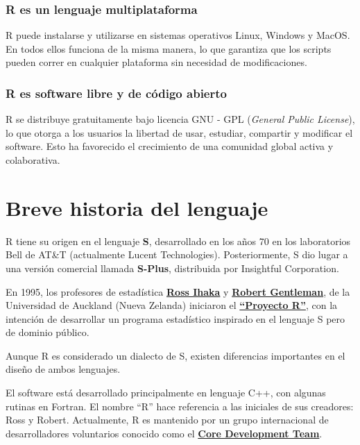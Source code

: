 \documentclass[
  spanish,
  a4paper,
]{scrbook}
\begin{document}
\subsubsection{R es un lenguaje
multiplataforma}\label{r-es-un-lenguaje-multiplataforma}

R puede instalarse y utilizarse en sistemas operativos Linux, Windows y
MacOS. En todos ellos funciona de la misma manera, lo que garantiza que
los scripts pueden correr en cualquier plataforma sin necesidad de
modificaciones.

\subsubsection{R es software libre y de código
abierto}\label{r-es-software-libre-y-de-cuxf3digo-abierto}

R se distribuye gratuitamente bajo licencia GNU - GPL (\emph{General
Public License}), lo que otorga a los usuarios la libertad de usar,
estudiar, compartir y modificar el software. Esto ha favorecido el
crecimiento de una comunidad global activa y colaborativa.

\section{Breve historia del lenguaje}\label{breve-historia-del-lenguaje}

R tiene su origen en el lenguaje \textbf{S}, desarrollado en los años 70
en los laboratorios Bell de AT\&T (actualmente Lucent Technologies).
Posteriormente, S dio lugar a una versión comercial llamada
\textbf{S-Plus}, distribuida por Insightful Corporation.

En 1995, los profesores de estadística
\href{https://en.wikipedia.org/wiki/Ross_Ihaka}{\textbf{Ross Ihaka}} y
\href{https://en.wikipedia.org/wiki/Robert_Gentleman_(statistician)}{\textbf{Robert
Gentleman}}, de la Universidad de Auckland (Nueva Zelanda) iniciaron el
\href{https://en.wikipedia.org/wiki/R_(programming_language)}{\textbf{``Proyecto
R''}}, con la intención de desarrollar un programa estadístico inspirado
en el lenguaje S pero de dominio público.

Aunque R es considerado un dialecto de S, existen diferencias
importantes en el diseño de ambos lenguajes.

El software está desarrollado principalmente en lenguaje C++, con
algunas rutinas en Fortran. El nombre ``R'' hace referencia a las
iniciales de sus creadores: Ross y Robert. Actualmente, R es mantenido
por un grupo internacional de desarrolladores voluntarios conocido como
el \href{https://www.r-project.org/contributors.html}{\textbf{Core
Development Team}}.
\end{document}
